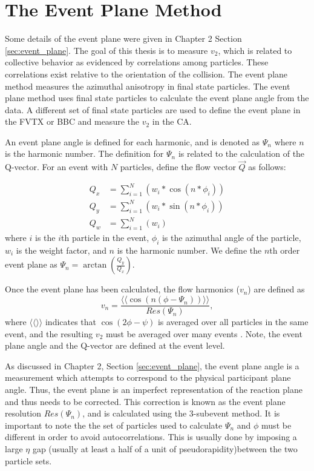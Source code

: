 \section{The Event Plane Method}
Some details of the event plane were given in Chapter 2 Section \ref{sec:event_plane}.
The goal of this thesis is to measure $v_2$, which is related to collective behavior as evidenced by correlations among particles. These correlations exist relative to the orientation of the collision. The event plane method measures the azimuthal anisotropy in final state particles. The event plane method uses final state particles to calculate the event plane angle from the data. A different set of final state particles are used to define the event plane in the FVTX or BBC and measure the $v_2$ in the CA. 

An event plane angle is defined for each harmonic, and is denoted as $\Psi_n$ where $n$ is the harmonic number. The definition for $\Psi_n$ is related to the calculation of the Q-vector. For an event with $N$ particles, define the flow vector $\vec{Q}$ as follows:

\begin{align}
Q_x &= \sum_{i=1}^{N}( w_i * \cos(n * \phi_i)) \\
Q_y &= \sum_{i=1}^{N}( w_i * \sin(n * \phi_i)) \\
Q_w &= \sum_{i=1}^{N}( w_i )
\label{eqn:general_ep_math}
\end{align}
where $i$ is the $i$th particle in the event, $\phi_i$ is the azimuthal angle of the particle, $w_i$ is the weight factor, and $n$ is the harmonic number. We define the $n$th order event plane as
$\Psi_n = \arctan \left( \frac{Q_y}{Q_x} \right). $

Once the event plane has been calculated, the flow harmonics ($v_n$) are defined as
\begin{equation}
v_n = \frac{\langle \langle\cos(n(\phi - \Psi_n))\rangle \rangle}{Res(\Psi_n)},
\end{equation}
where $\langle \langle \rangle \rangle$ indicates that $\cos(2\phi-\psi)$ is averaged over all particles in the same event, and the resulting $v_2$ must be averaged over many events \cite{PhysRevC.58.1671}. Note, the event plane angle and the Q-vector are defined at the event level.
  
As discussed in Chapter 2, Section \ref{sec:event_plane}, the event plane angle is a measurement which attempts to correspond to the physical participant plane angle. Thus, the event plane is an imperfect representation of the reaction plane and thus needs to be corrected. This correction is known as the event plane resolution $Res(\Psi_n)$, and is calculated using the 3-subevent method. It is important to note the the set of particles used to calculate $\Psi_n$ and $\phi$ must be different in order to avoid autocorrelations. This is usually done by imposing a large $\eta$ gap (usually at least a half of a unit of pseudorapidity)between the two particle sets.

